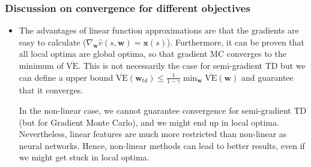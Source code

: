 \subsubsection{Discussion on convergence for different objectives}
\begin{itemize}
	\item The advantages of linear function approximations are that the gradients are easy to calculate ($\nabla_{\bm{w}}\hat{v}(s,\bm{w})=\bm{x}(s)$). Furthermore, it can be proven that all local optima are global optima, so that gradient MC converges to the minimum of $\overline{\text{VE}}$. This is not necessarily the case for semi-gradient TD but we can define a upper bound $\overline{\text{VE}}(\bm{w}_{td})\leq \frac{1}{1-\gamma}\min_{\bm{w}}\overline{\text{VE}}(\bm{w})$ and guarantee that it converges. 
	
	In the non-linear case, we cannot guarantee convergence for semi-gradient TD (but for Gradient Monte Carlo), and we might end up in local optima. Nevertheless, linear features are much more restricted than non-linear as neural networks. Hence, non-linear methods can lead to better results, even if we might get stuck in local optima.
	

\end{itemize}
